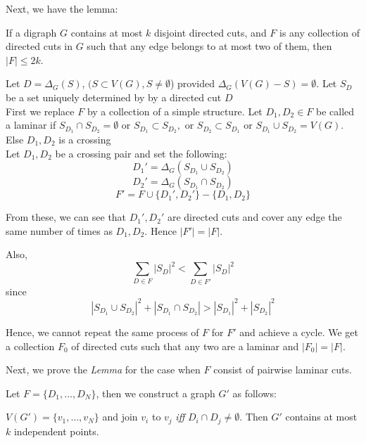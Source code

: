 \documentclass[8pt]{beamer}
\begin{document}
\begin{frame}

Next, we have the lemma:\\
\begin{ly_lemma}[]
If a digraph $G$ contains at most $k$ disjoint directed cuts, and $F$ is any collection of directed cuts in $G$ such that any edge belongs to at most two of them, then $|F| \le 2k$. 
\end{ly_lemma}

Let $D=\Delta_G(S)$, $(S\subset V(G), S\ne \emptyset$) provided $\Delta_G(V(G)-S)=\emptyset$. Let $S_D$ be a set uniquely determined by by a directed cut $D$\\

First we replace $F$ by a collection of a simple structure. Let $D_1, D_2 \in F$ be called a laminar if $S_{D_1}\cap S_{D_2}=\emptyset \text{ or } S_{D_1}\subset S_{D_2}, \text{ or } S_{D_2}\subset S_{D_1} \text{ or } S_{D_1}\cup S_{D_2} = V(G)$. Else $D_1, D_2$ is a crossing\\

Let $D_1, D_2$ be a crossing pair and set the following:
$$D_1'=\Delta_G(S_{D_1} \cup S_{D_2})$$
$$D_2'=\Delta_G(S_{D_1} \cap S_{D_2})$$
$$F'=F\cup \{D_1',D_2' \}-\{D_1,D_2 \}$$

From these, we can see that $D_1', D_2'$ are directed cuts and cover any edge the same number of times as $D_1, D_2$. Hence $|F'| = |F|$. 

\end{frame}

\begin{frame}

Also,
$$\underset{D\in F}{\sum}|S_D|^2 < \underset{D\in F'}{\sum}|S_D|^2$$
since 
$$|S_{D_1}\cup S_{D_2}|^2 + |S_{D_1}\cap S_{D_2}|>|S_{D_1}|^2+|S_{D_2}|^2$$

Hence, we cannot repeat the same process of $F$ for $F'$ and achieve a cycle.
We get a collection $F_0$ of directed cuts such that any two are a laminar and $|F_0| = |F|$. 

Next, we prove the \textit{Lemma} for the case when $F$ consist of pairwise laminar cuts. 

Let $F=\{D_1,\dots,D_N\}$, then we construct a graph $G'$ as follows:

$V(G')=\{v_1,\dots,v_N\}$ and join $v_i$ to $v_j$ \textit{iff} $D_i \cap D_j \ne \emptyset$.
Then $G'$ contains at most $k$ independent points. 

\end{frame}
\end{document}

